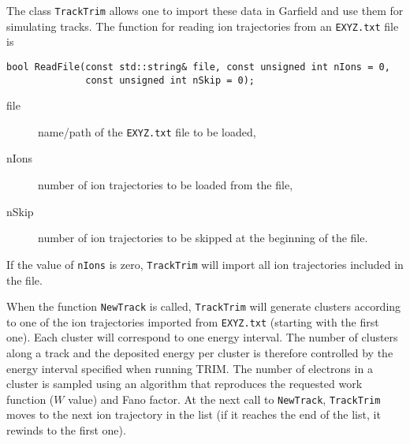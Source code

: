The class \texttt{TrackTrim} allows one to import these data in Garfield 
and use them for simulating tracks. The function for 
reading ion trajectories from an \texttt{EXYZ.txt} file is 
\begin{lstlisting}
bool ReadFile(const std::string& file, const unsigned int nIons = 0,
              const unsigned int nSkip = 0);
\end{lstlisting}
\begin{description}
  \item[file] name/path of the \texttt{EXYZ.txt} file to be loaded,
  \item[nIons] number of ion trajectories to be loaded from the file,
  \item[nSkip] number of ion trajectories to be skipped at the beginning of the file.
\end{description}
If the value of \texttt{nIons} is zero, \texttt{TrackTrim} will 
import all ion trajectories included in the file.

When the function \texttt{NewTrack} is called, 
\texttt{TrackTrim} will generate clusters according to one of the ion 
trajectories imported from \texttt{EXYZ.txt} (starting with the first one). 
Each cluster will correspond to one energy interval. 
The number of clusters along a track and the deposited energy per cluster 
is therefore controlled by the energy interval specified when running TRIM.
The number of electrons in a cluster is sampled using an algorithm 
that reproduces the requested work function ($W$ value) and Fano factor.
At the next call to \texttt{NewTrack}, \texttt{TrackTrim} moves to the  
next ion trajectory in the list (if it reaches the end of the list, 
it rewinds to the first one). 
